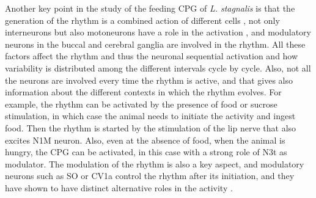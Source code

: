 Another key point in the study of the feeding CPG of \textit{L. stagnalis} is that the generation of the rhythm is a combined action of different cells \parencite{benjamin_distributed_2012}, not only interneurons but also motoneurons have a role in the activation \parencite{staras_patterngenerating_1998}, and modulatory neurons in the buccal and cerebral ganglia are involved in the rhythm. All these factors affect the rhythm and thus the neuronal sequential activation and how variability is distributed among the different intervals cycle by cycle. Also, not all the neurons are involved every time the rhythm is active, and that gives also information about the different contexts in which the rhythm evolves. For example, the rhythm can be activated by the presence of food or sucrose stimulation, in which case the animal needs to initiate the activity and ingest food. Then the rhythm is started by the stimulation of the lip nerve that also excites N1M neuron. Also, even at the absence of food, when the animal is hungry, the CPG can be activated, in this case with a strong role of N3t as modulator. The modulation of the rhythm is also a key aspect, and modulatory neurons such as SO or CV1a control the rhythm after its initiation, and they have shown to have distinct alternative roles in the activity \parencite{kemenes_multiple_2001}. 

